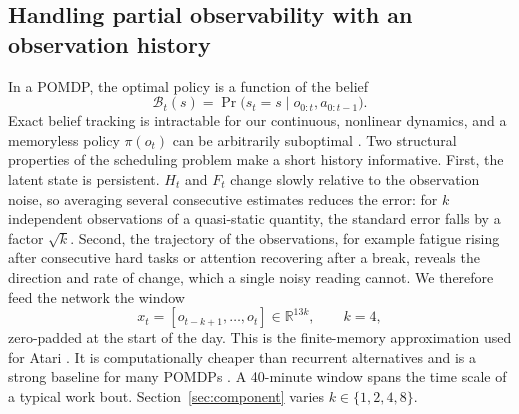 \subsection{Handling partial observability with an observation history}
In a POMDP, the optimal policy is a function of the belief \cite{astrom1965,kaelbling1998}
\begin{equation}
\mathcal B_t(s)=\Pr\big(s_t=s\mid o_{0:t},a_{0:t-1}\big).
\label{eq:belief}
\end{equation}
 Exact belief tracking is intractable for our continuous, nonlinear dynamics, and a memoryless policy $\pi(o_t)$ can be arbitrarily suboptimal \cite{singh1994}. Two structural properties of the scheduling problem make a short history informative. First, the latent state is persistent. $H_t$ and $F_t$ change slowly relative to the observation noise, so averaging several consecutive estimates reduces the error: for $k$ independent observations of a quasi-static quantity, the standard error falls by a factor $\sqrt k$. Second, the trajectory of the observations, for example fatigue rising after consecutive hard tasks or attention recovering after a break, reveals the direction and rate of change, which a single noisy reading cannot. We therefore feed the network the window
\begin{equation}
x_t=[o_{t-k+1},\dots,o_t]\in\mathbb R^{13k},\qquad k=4,
\end{equation}
zero-padded at the start of the day. This is the finite-memory approximation used for Atari \cite{mnih2015}. It is computationally cheaper than recurrent alternatives \cite{hausknecht2015,igl2018} and is a strong baseline for many POMDPs \cite{ni2022}. A 40-minute window spans the time scale of a typical work bout. Section~\ref{sec:component} varies $k\in\{1,2,4,8\}$.

